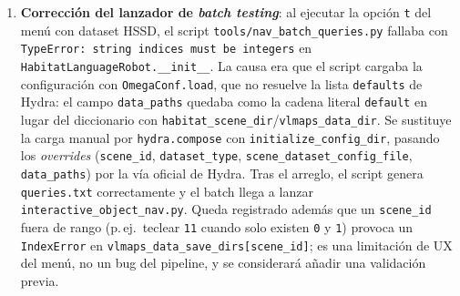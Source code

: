 \begin{enumerate}
  \item \textbf{Corrección del lanzador de \textit{batch testing}}: al ejecutar
        la opción \texttt{t} del menú con dataset HSSD, el script
        \texttt{tools/nav\_batch\_queries.py} fallaba con
        \texttt{TypeError: string indices must be integers} en
        \texttt{HabitatLanguageRobot.\_\_init\_\_}. La causa era que el script
        cargaba la configuración con \texttt{OmegaConf.load}, que no resuelve
        la lista \texttt{defaults} de Hydra: el campo \texttt{data\_paths}
        quedaba como la cadena literal \texttt{default} en lugar del
        diccionario con \texttt{habitat\_scene\_dir}/\texttt{vlmaps\_data\_dir}.
        Se sustituye la carga manual por \texttt{hydra.compose} con
        \texttt{initialize\_config\_dir}, pasando los \emph{overrides}
        (\texttt{scene\_id}, \texttt{dataset\_type},
        \texttt{scene\_dataset\_config\_file}, \texttt{data\_paths}) por la
        vía oficial de Hydra. Tras el arreglo, el script genera
        \texttt{queries.txt} correctamente y el batch llega a lanzar
        \texttt{interactive\_object\_nav.py}. Queda registrado además que un
        \texttt{scene\_id} fuera de rango (p.\,ej.\ teclear \texttt{11} cuando
        solo existen \texttt{0} y \texttt{1}) provoca un \texttt{IndexError}
        en \texttt{vlmaps\_data\_save\_dirs[scene\_id]}; es una limitación
        de UX del menú, no un bug del pipeline, y se considerará añadir una
        validación previa.


\end{enumerate}
